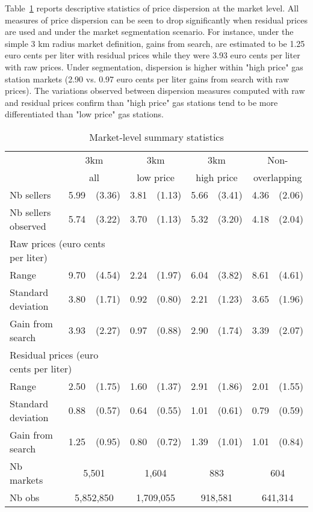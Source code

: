 \documentclass[english]{article}
\begin{document}
Table~\ref{tab:stats_des_markets} reports descriptive statistics of price dispersion at the market level. All measures of price dispersion can be seen to drop significantly when residual prices are used and under the market segmentation scenario. For instance, under the simple 3 km radius market definition, gains from search, are estimated to be 1.25 euro cents per liter with residual prices while they were 3.93 euro cents per liter with raw prices. Under segmentation, dispersion is higher within "high price" gas station markets (2.90 vs. 0.97 euro cents per liter gains from search with raw prices). The variations observed between dispersion measures computed with raw and residual prices confirm than "high price" gas stations tend to be more differentiated than "low price" gas stations.

\begin{table}[H]
  \caption{Market-level summary statistics}
\begin{tabular}{lrrrrrrrr}
\hline
\hline
      & \multicolumn{2}{c}{3km}    & \multicolumn{2}{c}{3km}       & \multicolumn{2}{c}{3km}        & \multicolumn{2}{c}{Non-} \\
      & \multicolumn{2}{c}{all}    & \multicolumn{2}{c}{low price} & \multicolumn{2}{c}{high price} & \multicolumn{2}{c}{overlapping} \\
\hline
Nb sellers & 5.99  & (3.36) & 3.81  & (1.13) & 5.66  & (3.41) & 4.36  & (2.06) \\
Nb sellers observed & 5.74  & (3.22) & 3.70  & (1.13) & 5.32  & (3.20) & 4.18  & (2.04) \\
\hline
\multicolumn{3}{l}{Raw prices (euro cents per liter)}          &       &       &       &       &       &  \\
Range & 9.70  & (4.54) & 2.24  & (1.97) & 6.04  & (3.82) & 8.61  & (4.61) \\
Standard deviation & 3.80  & (1.71) & 0.92  & (0.80) & 2.21  & (1.23) & 3.65  & (1.96) \\
Gain from search & 3.93  & (2.27) & 0.97  & (0.88) & 2.90  & (1.74) & 3.39  & (2.07) \\
\hline
\multicolumn{3}{l}{Residual prices (euro cents per liter)}      &       &       &       &       &       &  \\
Range & 2.50  & (1.75) & 1.60  & (1.37) & 2.91  & (1.86) & 2.01  & (1.55) \\
Standard deviation & 0.88  & (0.57) & 0.64  & (0.55) & 1.01  & (0.61) & 0.79  & (0.59) \\
Gain from search & 1.25  & (0.95) & 0.80  & (0.72) & 1.39  & (1.01) & 1.01  & (0.84) \\
\hline
Nb markets & \multicolumn{2}{c}{5,501} & \multicolumn{2}{c}{1,604} & \multicolumn{2}{c}{883} & \multicolumn{2}{c}{604} \\
Nb obs     & \multicolumn{2}{c}{5,852,850} & \multicolumn{2}{c}{1,709,055} & \multicolumn{2}{c}{918,581} & \multicolumn{2}{c}{641,314} \\
\hline
\hline
\end{tabular}
\label{tab:stats_des_markets}
\end{table}
\end{document}
